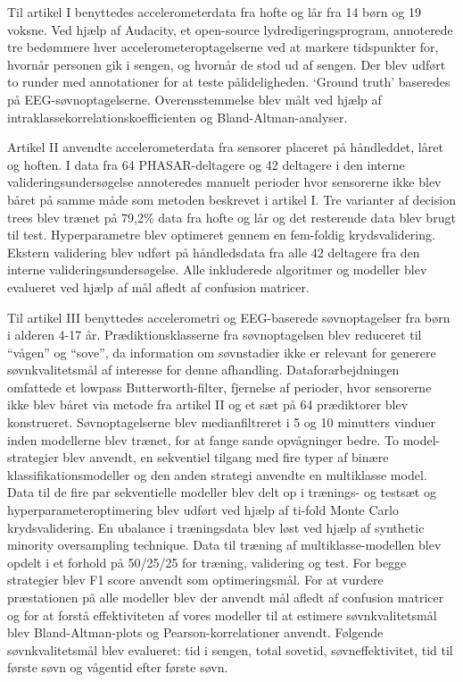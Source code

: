 \documentclass[
  10pt,
]{scrbook}
\begin{document}
Til artikel I benyttedes accelerometerdata fra hofte og lår fra 14 børn
og 19 voksne. Ved hjælp af Audacity, et open-source
lydredigeringsprogram, annoterede tre bedømmere hver
accelerometeroptagelserne ved at markere tidspunkter for, hvornår
personen gik i sengen, og hvornår de stod ud af sengen. Der blev udført
to runder med annotationer for at teste pålideligheden. `Ground truth'
baseredes på EEG-søvnoptagelserne. Overensstemmelse blev målt ved hjælp
af intraklassekorrelationskoefficienten og Bland-Altman-analyser.

Artikel II anvendte accelerometerdata fra sensorer placeret på
håndleddet, låret og hoften. I data fra 64 PHASAR-deltagere og 42
deltagere i den interne valideringsundersøgelse annoteredes manuelt
perioder hvor sensorerne ikke blev båret på samme måde som metoden
beskrevet i artikel I. Tre varianter af decision trees blev trænet på
79,2\% data fra hofte og lår og det resterende data blev brugt til test.
Hyperparametre blev optimeret gennem en fem-foldig krydsvalidering.
Ekstern validering blev udført på håndledsdata fra alle 42 deltagere fra
den interne valideringsundersøgelse. Alle inkluderede algoritmer og
modeller blev evalueret ved hjælp af mål afledt af confusion matricer.

Til artikel III benyttedes accelerometri og EEG-baserede søvnoptagelser
fra børn i alderen 4-17 år. Prædiktionsklasserne fra søvnoptagelsen blev
reduceret til ``vågen'' og ``sove'', da information om søvnstadier ikke
er relevant for generere søvnkvalitetsmål af interesse for denne
afhandling. Dataforarbejdningen omfattede et lowpass Butterworth-filter,
fjernelse af perioder, hvor sensorerne ikke blev båret via metode fra
artikel II og et sæt på 64 prædiktorer blev konstrueret.
Søvnoptagelserne blev medianfiltreret i 5 og 10 minutters vinduer inden
modellerne blev trænet, for at fange sande opvågninger bedre. To
model-strategier blev anvendt, en sekventiel tilgang med fire typer af
binære klassifikationsmodeller og den anden strategi anvendte en
multiklasse model. Data til de fire par sekventielle modeller blev delt
op i trænings- og testsæt og hyperparameteroptimering blev udført ved
hjælp af ti-fold Monte Carlo krydsvalidering. En ubalance i træningsdata
blev løst ved hjælp af synthetic minority oversampling technique. Data
til træning af multiklasse-modellen blev opdelt i et forhold på 50/25/25
for træning, validering og test. For begge strategier blev F1 score
anvendt som optimeringsmål. For at vurdere præstationen på alle modeller
blev der anvendt mål afledt af confusion matricer og for at forstå
effektiviteten af vores modeller til at estimere søvnkvalitetsmål blev
Bland-Altman-plots og Pearson-korrelationer anvendt. Følgende
søvnkvalitetsmål blev evalueret: tid i sengen, total sovetid,
søvneffektivitet, tid til første søvn og vågentid efter første søvn.
\end{document}
